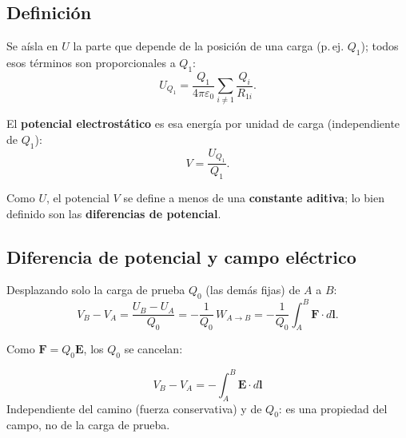 \documentclass[12pt,a4paper]{article}
\begin{document}
\subsection{Definición}

Se aísla en $U$ la parte que depende de la posición de una carga (p.\,ej.
$Q_1$); todos esos términos son proporcionales a $Q_1$:
\[
U_{Q_1} = \frac{Q_1}{4\pi\varepsilon_0}\sum_{i\neq 1}\frac{Q_i}{R_{1i}} .
\]

El \textbf{potencial electrostático} es esa energía por unidad de carga
(independiente de $Q_1$):
\[
\boxed{V = \frac{U_{Q_1}}{Q_1}} .
\]

Como $U$, el potencial $V$ se define a menos de una \textbf{constante
aditiva}; lo bien definido son las \textbf{diferencias de potencial}.

\subsection{Diferencia de potencial y campo eléctrico}

Desplazando solo la carga de prueba $Q_0$ (las demás fijas) de $A$ a
$B$:
\[
V_B - V_A = \frac{U_B - U_A}{Q_0} = -\frac{1}{Q_0}\,W_{A\to B}
= -\frac{1}{Q_0}\int_A^B \mathbf{F}\cdot d\mathbf{l} .
\]

Como $\mathbf{F} = Q_0\mathbf{E}$, los $Q_0$ se cancelan:



\begin{keybox}
  \[
  \boxed{V_B - V_A = -\int_A^B \mathbf{E}\cdot d\mathbf{l}}
  \]
  Independiente del camino (fuerza conservativa) y de $Q_0$: es una
  propiedad del campo, no de la carga de prueba.
\end{keybox}
\end{document}

